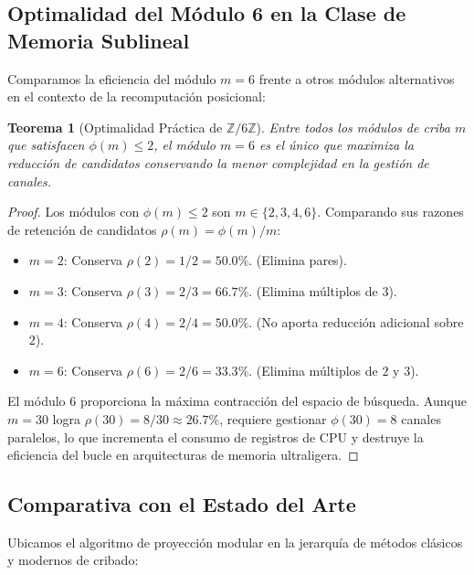\documentclass{article}
\numberwithin{equation}{section}
\theoremstyle{plain}
\newtheorem{theorem}{Teorema}[section]
\theoremstyle{definition}
\begin{document}
\subsection{Optimalidad del Módulo 6 en la Clase de Memoria Sublineal}

Comparamos la eficiencia del módulo $m=6$ frente a otros módulos alternativos en el contexto de la recomputación posicional:

\begin{theorem}[Optimalidad Práctica de $\mathbb{Z}/6\mathbb{Z}$]
\label{thm:optimalidad-practica}
Entre todos los módulos de criba $m$ que satisfacen $\phi(m) \le 2$, el módulo $m = 6$ es el único que maximiza la reducción de candidatos conservando la menor complejidad en la gestión de canales.
\end{theorem}

\begin{proof}
Los módulos con $\phi(m) \le 2$ son $m \in \{2, 3, 4, 6\}$. Comparando sus razones de retención de candidatos $\rho(m) = \phi(m)/m$:
\begin{itemize}
    \item $m = 2$: Conserva $\rho(2) = 1/2 = 50.0\%$. (Elimina pares).
    \item $m = 3$: Conserva $\rho(3) = 2/3 = 66.7\%$. (Elimina múltiplos de $3$).
    \item $m = 4$: Conserva $\rho(4) = 2/4 = 50.0\%$. (No aporta reducción adicional sobre $2$).
    \item $m = 6$: Conserva $\rho(6) = 2/6 = 33.3\%$. (Elimina múltiplos de $2$ y $3$).
\end{itemize}
El módulo $6$ proporciona la máxima contracción del espacio de búsqueda. Aunque $m = 30$ logra $\rho(30) = 8/30 \approx 26.7\%$, requiere gestionar $\phi(30) = 8$ canales paralelos, lo que incrementa el consumo de registros de CPU y destruye la eficiencia del bucle en arquitecturas de memoria ultraligera.
\end{proof}

\subsection{Comparativa con el Estado del Arte}

Ubicamos el algoritmo de proyección modular en la jerarquía de métodos clásicos y modernos de cribado:
\end{document}
